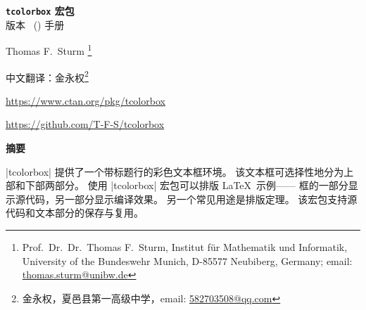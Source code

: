 \tcbuselistingtext
{}


\clearpage
\begin{center}
\begin{tcolorbox}[enhanced,hbox,tikznode,left=8mm,right=8mm,boxrule=0.4pt,
  colback=white,colframe=black!50!yellow,
  drop lifted shadow=black!50!yellow,arc is angular,
  before=\par\vspace*{5mm},after=\par\bigskip]
{\bfseries\LARGE \texttt{tcolorbox} 宏包}\\[3mm]
{\large 版本 \version\ (\datum) 手册}
\end{tcolorbox}
{\large Thomas F.~Sturm%
  \footnote{Prof.~Dr.~Dr.~Thomas F.~Sturm, Institut f\"{u}r Mathematik und Informatik,
    University of the Bundeswehr Munich, D-85577 Neubiberg, Germany;
     email: \href{mailto:thomas.sturm@unibw.de}{thomas.sturm@unibw.de}}\par\medskip
 \large 中文翻译：金永权\footnote{金永权，夏邑县第一高级中学，email: \href{mailto:582703508@qq.com}{582703508@qq.com}}\par\medskip
\normalsize\url{https://www.ctan.org/pkg/tcolorbox}\par
\url{https://github.com/T-F-S/tcolorbox}}
\end{center}
\bigskip
\begin{absquote}
  \begin{center}\bfseries 摘要\end{center}
  |tcolorbox| 提供了一个带标题行的彩色文本框环境。
  该文本框可选择性地分为上部和下部两部分。
  使用 |tcolorbox| 宏包可以排版 \LaTeX\ 示例——
  框的一部分显示源代码，另一部分显示编译效果。
  另一个常见用途是排版定理。
  该宏包支持源代码和文本部分的保存与复用。
\end{absquote}

